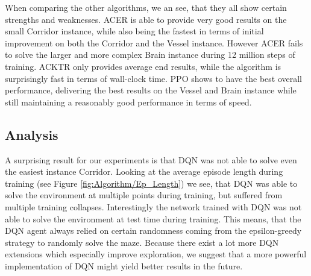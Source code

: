 When comparing the other algorithms, we an see, that they all show certain strengths and weaknesses. ACER is able to provide very good results on the small Corridor instance, while also being the fastest in terms of initial improvement on both the Corridor and the Vessel instance. However ACER fails to solve the larger and more complex Brain instance during 12 million steps of training. ACKTR only provides average end results, while the algorithm is surprisingly fast in terms of wall-clock time. PPO shows to have the best overall performance, delivering the best results on the Vessel and Brain instance while still maintaining a reasonably good performance in terms of speed.   

\subsection{Analysis}
A surprising result for our experiments is that DQN was not able to solve even the easiest instance Corridor. Looking at the average episode length during training (see Figure \ref{fig:Algorithm/Ep_Length}) we see, that DQN was able to solve the environment at multiple points during training, but suffered from multiple training collapses. Interestingly the network trained with DQN was not able to solve the environment at test time during training. This means, that the DQN agent always relied on certain randomness coming from the epsilon-greedy strategy to randomly solve the maze. Because there exist a lot more DQN extensions which especially improve exploration, we suggest that a more powerful implementation of DQN might yield better results in the future.


